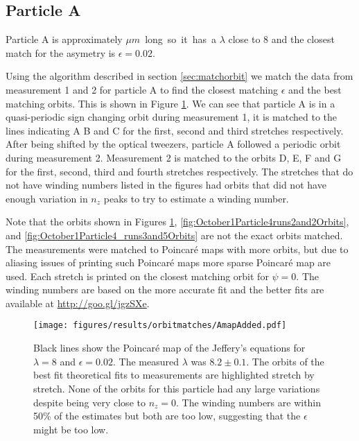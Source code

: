 \subsection{Particle A}
Particle A is approximately \unit[24]{$\mu m$} long so it has a $\lambda$ close to 8 and the closest match for the asymetry is $\epsilon = 0.02$. 

Using the algorithm described in section \ref{sec:matchorbit} we match the data from measurement 1 and 2 for particle A to find the closest matching $\epsilon$ and the best matching orbits. This is shown in Figure \ref{fig:particleAOrbitFit}. We can see that particle A is in a quasi-periodic sign changing orbit during measurement 1, it is matched to the lines indicating A B and C for the first, second and third stretches respectively.  After being shifted by the optical tweezers, particle A followed a periodic orbit during measurement 2. Measurement 2 is matched to the orbits D, E, F and G for the first, second, third and fourth stretches respectively. The stretches that do not have winding numbers listed in the figures had orbits that did not have enough variation in $n_z$ peaks to try to estimate a winding number. 

Note that the orbits shown in Figures \ref{fig:particleAOrbitFit}, \ref{fig:October1Particle4runs2and2Orbits}, and \ref{fig:October1Particle4_runs3and5Orbits} are not the exact orbits matched. The measurements were matched to Poincaré maps with more orbits, but due to aliasing issues of printing such Poincaré maps more sparse Poincaré map are used. Each stretch is printed on the closest matching orbit for $\psi = 0$. The winding numbers are based on the more accurate fit and the better fits are available at \url{http://goo.gl/jgzSXe}. 

\begin{figure}[H]
\begin{center}
\texttt{[image: figures/results/orbitmatches/AmapAdded.pdf]}
\end{center}
\caption{Black lines show the Poincaré map of the Jeffery's equations for $\lambda = 8$ and $\epsilon = 0.02$. The measured $\lambda$ was $8.2 \pm 0.1$. The orbits of the best fit theoretical fits to measurements are highlighted stretch by stretch. None of the orbits for this particle had any large variations despite being very close to $n_z=0$. The winding numbers are within 50\% of the estimates but both are too low, suggesting that the $\epsilon$ might be too low.}
\label{fig:particleAOrbitFit}
\end{figure}

